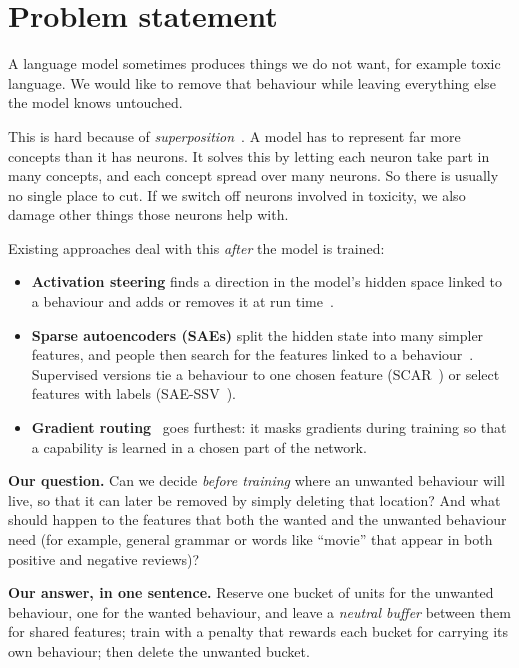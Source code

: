 \documentclass[11pt,a4paper]{article}
\theoremstyle{definition}
\begin{document}
\tableofcontents
\newpage

\section{Problem statement}
\label{sec:problem}

A language model sometimes produces things we do not want, for example toxic language. We would
like to remove that behaviour while leaving everything else the model knows untouched.

This is hard because of \emph{superposition}~\cite{elhage2022toy}. A model has to represent far more
concepts than it has neurons. It solves this by letting each neuron take part in many concepts,
and each concept spread over many neurons. So there is usually no single place to cut.
If we switch off neurons involved in toxicity, we also damage other things those neurons help with.


Existing approaches deal with this \emph{after} the model is trained:
\begin{itemize}
  \item \textbf{Activation steering} finds a direction in the model's hidden space linked to a
  behaviour and adds or removes it at run time~\cite{turner2023actadd,rimsky2024caa,li2023iti,zou2023repe}.
  \item \textbf{Sparse autoencoders (SAEs)} split the hidden state into many simpler features,
  and people then search for the features linked to a behaviour~\cite{bricken2023monosemanticity,cunningham2024sparse,gao2024scaling}.
  Supervised versions tie a behaviour to one chosen feature (SCAR~\cite{harle2024scar}) or
  select features with labels (SAE-SSV~\cite{he2025saessv}).
  \item \textbf{Gradient routing}~\cite{cloud2024gradient} goes furthest: it masks gradients during
  training so that a capability is learned in a chosen part of the network.
\end{itemize}

\textbf{Our question.} Can we decide \emph{before training} where an unwanted behaviour will live,
so that it can later be removed by simply deleting that location? And what should happen to the
features that both the wanted and the unwanted behaviour need (for example, general grammar or
words like ``movie'' that appear in both positive and negative reviews)?

\textbf{Our answer, in one sentence.} Reserve one bucket of units for the unwanted behaviour, one
for the wanted behaviour, and leave a \emph{neutral buffer} between them for shared features;
train with a penalty that rewards each bucket for carrying its own behaviour; then delete the
unwanted bucket.
\end{document}
